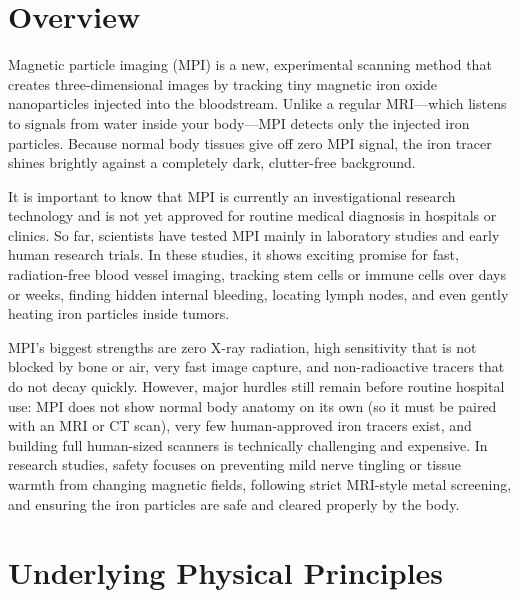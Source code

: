 \label{ch:infographic-mpi}

\section{Overview}

Magnetic particle imaging (MPI) is a new, experimental scanning method that creates three-dimensional images by tracking tiny magnetic iron oxide nanoparticles injected into the bloodstream. Unlike a regular MRI---which listens to signals from water inside your body---MPI detects only the injected iron particles. Because normal body tissues give off zero MPI signal, the iron tracer shines brightly against a completely dark, clutter-free background.

It is important to know that MPI is currently an investigational research technology and is not yet approved for routine medical diagnosis in hospitals or clinics. So far, scientists have tested MPI mainly in laboratory studies and early human research trials. In these studies, it shows exciting promise for fast, radiation-free blood vessel imaging, tracking stem cells or immune cells over days or weeks, finding hidden internal bleeding, locating lymph nodes, and even gently heating iron particles inside tumors.

MPI's biggest strengths are zero X-ray radiation, high sensitivity that is not blocked by bone or air, very fast image capture, and non-radioactive tracers that do not decay quickly. However, major hurdles still remain before routine hospital use: MPI does not show normal body anatomy on its own (so it must be paired with an MRI or CT scan), very few human-approved iron tracers exist, and building full human-sized scanners is technically challenging and expensive. In research studies, safety focuses on preventing mild nerve tingling or tissue warmth from changing magnetic fields, following strict MRI-style metal screening, and ensuring the iron particles are safe and cleared properly by the body.

\section{Underlying Physical Principles}


